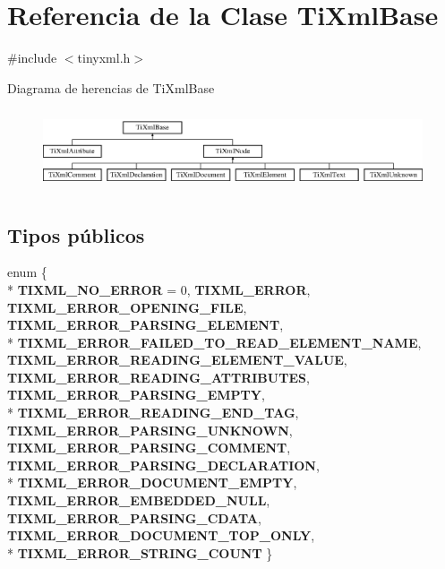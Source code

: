 \hypertarget{class_ti_xml_base}{\section{Referencia de la Clase Ti\-Xml\-Base}
\label{class_ti_xml_base}
}


{\ttfamily \#include $<$tinyxml.\-h$>$}

Diagrama de herencias de Ti\-Xml\-Base\begin{figure}[H]
\begin{center}
\leavevmode
\includegraphics[height=2.413793cm]{class_ti_xml_base}
\end{center}
\end{figure}
\subsection*{Tipos públicos}
\begin{DoxyCompactItemize}
\item 
enum \{ \\*
{\bfseries T\-I\-X\-M\-L\-\_\-\-N\-O\-\_\-\-E\-R\-R\-O\-R} = 0, 
{\bfseries T\-I\-X\-M\-L\-\_\-\-E\-R\-R\-O\-R}, 
{\bfseries T\-I\-X\-M\-L\-\_\-\-E\-R\-R\-O\-R\-\_\-\-O\-P\-E\-N\-I\-N\-G\-\_\-\-F\-I\-L\-E}, 
{\bfseries T\-I\-X\-M\-L\-\_\-\-E\-R\-R\-O\-R\-\_\-\-P\-A\-R\-S\-I\-N\-G\-\_\-\-E\-L\-E\-M\-E\-N\-T}, 
\\*
{\bfseries T\-I\-X\-M\-L\-\_\-\-E\-R\-R\-O\-R\-\_\-\-F\-A\-I\-L\-E\-D\-\_\-\-T\-O\-\_\-\-R\-E\-A\-D\-\_\-\-E\-L\-E\-M\-E\-N\-T\-\_\-\-N\-A\-M\-E}, 
{\bfseries T\-I\-X\-M\-L\-\_\-\-E\-R\-R\-O\-R\-\_\-\-R\-E\-A\-D\-I\-N\-G\-\_\-\-E\-L\-E\-M\-E\-N\-T\-\_\-\-V\-A\-L\-U\-E}, 
{\bfseries T\-I\-X\-M\-L\-\_\-\-E\-R\-R\-O\-R\-\_\-\-R\-E\-A\-D\-I\-N\-G\-\_\-\-A\-T\-T\-R\-I\-B\-U\-T\-E\-S}, 
{\bfseries T\-I\-X\-M\-L\-\_\-\-E\-R\-R\-O\-R\-\_\-\-P\-A\-R\-S\-I\-N\-G\-\_\-\-E\-M\-P\-T\-Y}, 
\\*
{\bfseries T\-I\-X\-M\-L\-\_\-\-E\-R\-R\-O\-R\-\_\-\-R\-E\-A\-D\-I\-N\-G\-\_\-\-E\-N\-D\-\_\-\-T\-A\-G}, 
{\bfseries T\-I\-X\-M\-L\-\_\-\-E\-R\-R\-O\-R\-\_\-\-P\-A\-R\-S\-I\-N\-G\-\_\-\-U\-N\-K\-N\-O\-W\-N}, 
{\bfseries T\-I\-X\-M\-L\-\_\-\-E\-R\-R\-O\-R\-\_\-\-P\-A\-R\-S\-I\-N\-G\-\_\-\-C\-O\-M\-M\-E\-N\-T}, 
{\bfseries T\-I\-X\-M\-L\-\_\-\-E\-R\-R\-O\-R\-\_\-\-P\-A\-R\-S\-I\-N\-G\-\_\-\-D\-E\-C\-L\-A\-R\-A\-T\-I\-O\-N}, 
\\*
{\bfseries T\-I\-X\-M\-L\-\_\-\-E\-R\-R\-O\-R\-\_\-\-D\-O\-C\-U\-M\-E\-N\-T\-\_\-\-E\-M\-P\-T\-Y}, 
{\bfseries T\-I\-X\-M\-L\-\_\-\-E\-R\-R\-O\-R\-\_\-\-E\-M\-B\-E\-D\-D\-E\-D\-\_\-\-N\-U\-L\-L}, 
{\bfseries T\-I\-X\-M\-L\-\_\-\-E\-R\-R\-O\-R\-\_\-\-P\-A\-R\-S\-I\-N\-G\-\_\-\-C\-D\-A\-T\-A}, 
{\bfseries T\-I\-X\-M\-L\-\_\-\-E\-R\-R\-O\-R\-\_\-\-D\-O\-C\-U\-M\-E\-N\-T\-\_\-\-T\-O\-P\-\_\-\-O\-N\-L\-Y}, 
\\*
{\bfseries T\-I\-X\-M\-L\-\_\-\-E\-R\-R\-O\-R\-\_\-\-S\-T\-R\-I\-N\-G\-\_\-\-C\-O\-U\-N\-T}
 \}
\end{DoxyCompactItemize}
